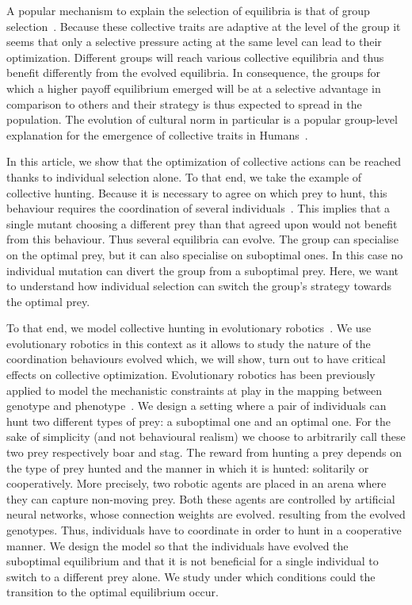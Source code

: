   A popular mechanism to explain the selection of equilibria is that of group selection~\parencite{Boyd1990}. Because these collective traits are adaptive at the level of the group it seems that only a selective pressure acting at the same level can lead to their optimization. Different groups will reach various collective equilibria and thus benefit differently from the evolved equilibria. In consequence, the groups for which a higher payoff equilibrium emerged will be at a selective advantage in comparison to others and their strategy is thus expected to spread in the population. The evolution of cultural norm in particular is a popular group-level explanation for the emergence of collective traits in Humans~\parencite{Boyd2002, Binmore2011, Smaldino2014}.

  In this article, we show that the optimization of collective actions can be reached thanks to individual selection alone. To that end, we take the example of collective hunting. Because it is necessary to agree on which prey to hunt, this behaviour requires the coordination of several individuals~\parencite{Alvard2002, Alvard2003, Drea2009a}. This implies that a single mutant choosing a different prey than that agreed upon would not benefit from this behaviour. Thus several equilibria can evolve. The group can specialise on the optimal prey, but it can also specialise on suboptimal ones. In this case no individual mutation can divert the group from a suboptimal prey. Here, we want to understand how individual selection can switch the group's strategy towards the optimal prey.

  To that end, we model collective hunting in evolutionary robotics~\parencite{Nolfi2000, Doncieux2015a}. We use evolutionary robotics in this context as it allows to study the nature of the coordination behaviours evolved which, we will show, turn out to have critical effects on collective optimization. Evolutionary robotics has been previously applied to model the mechanistic constraints at play in the mapping between genotype and phenotype~\parencite{Mitri2013, Trianni2014b, Bernard2016a}. We design a setting where a pair of individuals can hunt two different types of prey: a suboptimal one and an optimal one. For the sake of simplicity (and not behavioural realism) we choose to arbitrarily call these two prey respectively boar and stag. The reward from hunting a prey depends on the type of prey hunted and the manner in which it is hunted: solitarily or cooperatively. More precisely, two robotic agents are placed in an arena where they can capture non-moving prey. Both these agents are controlled by artificial neural networks, whose connection weights are evolved. resulting from the evolved genotypes. Thus, individuals have to coordinate in order to hunt in a cooperative manner. We design the model so that the individuals have evolved the suboptimal equilibrium and that it is not beneficial for a single individual to switch to a different prey alone. We study under which conditions could the transition to the optimal equilibrium occur.

